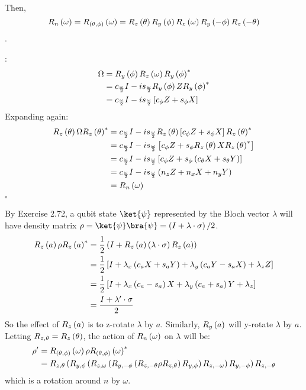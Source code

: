 %
Then,
%
$$R_{n} \left( \omega \right) = R_{\left( \theta, \phi \right)} \left( \omega \right) = R_{z} \left( \theta \right) R_{y} \left( \phi \right) R_{z} \left( \omega \right) R_{y} \left( -\phi \right) R_{z} \left( -\theta \right)$$.
%
\par \proof:
%
\begin{align*}
\Omega &= R_{y} \left( \phi \right) R_{z} \left( \omega \right) R_{y} \left( \phi \right)^* \\
&= c_{\frac{\omega}{2}} I - i s_{\frac{\omega}{2}} R_{y} \left( \phi \right) Z R_{y} \left( \phi \right)^* \\
&= c_{\frac{\omega}{2}} I - i s_{\frac{\omega}{2}} \left[ c_\phi Z + s_\phi X \right]
\end{align*}
%
Expanding again:
%
\begin{align*}
R_{z} \left( \theta \right) \Omega R_{z} \left( \theta \right)^* &= c_{\frac{\omega}{2}} I - i s_{\frac{\omega}{2}} R_{z} \left( \theta \right) \left[ c_\phi Z + s_\phi X \right] R_{z} \left( \theta \right)^* \\
&= c_{\frac{\omega}{2}} I - i s_{\frac{\omega}{2}} \left[ c_\phi Z + s_\phi R_{z} \left( \theta \right) X R_{z} \left( \theta \right)^* \right] \\
&= c_{\frac{\omega}{2}} I - i s_{\frac{\omega}{2}} \left[ c_\phi Z + s_\phi \left( c_{\theta} X + s_{\theta} Y \right) \right] \\
&= c_{\frac{\omega}{2}} I - i s_{\frac{\omega}{2}} \left( n_z Z + n_x X + n_y Y \right) \\
&= R_{n} \left( \omega \right)
\end{align*}
%
\hfill $\square$
%
\par By Exercise 2.72, a qubit state $\ket{\psi}$ represented by the Bloch vector $\lambda$ will have density matrix $\rho = \ket{\psi} \bra{\psi} = \left( I + \lambda \cdot \sigma \right) / 2$.
%
\begin{align*}
R_{z} \left( a \right) \rho R_{z} \left( a \right)^* &= \frac12 \left( I + R_{z} \left( a \right) \left( \lambda \cdot \sigma \right) R_{z} \left( a \right) \right) \\
&= \frac12 \left[ I + \lambda_x \left( c_a X + s_a Y\right) + \lambda_y \left( c_a Y - s_a X \right) + \lambda_z Z \right] \\
&= \frac12 \left[ I + \lambda_x \left( c_a - s_ a \right) X + \lambda_y \left( c_a + s_a \right) Y + \lambda_z \right] \\
&= \frac{I + \lambda' \cdot \sigma}{2}
\end{align*}
%
So the effect of $R_{z} \left( a \right)$ is to z-rotate $\lambda$ by $a$.
%
Similarly, $R_{y} \left( a \right)$ will y-rotate $\lambda$ by $a$.
%
Letting $R_{z, \theta} = R_{z} \left( \theta \right)$, the action of $R_{n} \left( \omega \right)$ on $\lambda$ will be:
%
\begin{align*}
\rho' &= R_{\left( \theta, \phi \right)} \left( \omega \right) \rho R_{\left( \theta, \phi \right)} \left( \omega \right)^* \\
&=
R_{z, \theta}
\left( R_{y, \phi}
\left( R_{z, \omega}
\left( R_{y, -\phi}
\left( R_{z, -\theta} \rho R_{z, \theta} \right)
R_{y, \phi} \right)
R_{z, -\omega} \right)
R_{y, -\phi} \right)
R_{z, -\theta}
\end{align*}
%
which is a rotation around $n$ by $\omega$.
\endgroup
